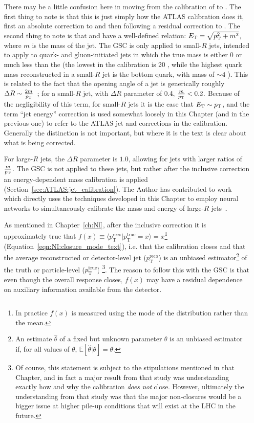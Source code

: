 There may be a little confusion here in moving from the calibration of \Et{} to \pt{}.
The first thing to note is that this is just simply how the ATLAS calibration does it, first an absolute correction to \Et{} and then following a residual correction to \pt{}.
The second thing to note is that \Et{} and \pt{} have a well-defined relation: $E_{\text{T}}=\sqrt{p_{\text{T}}^2+m^2}$, where $m$ is the mass of the jet.
The GSC is only applied to small-$R$ jets, intended to apply to quark- and gluon-initiated jets in which the true mass is either $0$ or much less than the \pt{} (the lowest \pt{} in the calibration is 20 \GeV, while the highest quark mass reconstructed in a small-$R$ jet is the bottom quark, with mass of $\sim4$ \GeV).
This is related to the fact that the opening angle of a jet is generically roughly $\Delta R \sim \frac{2m}{p_{\text{T}}}$~\cite{Shelton:2013an}; for a small-$R$ jet, with $\Delta R$ parameter of 0.4, $\frac{m}{p_{\text{T}}}<0.2$.
Because of the negligibility of this term, for small-$R$ jets it is the case that $E_{\text{T}}\sim p_{\text{T}}$, and the term ``jet energy'' correction is used somewhat loosely in this Chapter (and in the previous one) to refer to the ATLAS jet \Et{} and \pT{} corrections in the calibration.
Generally the distinction is not important, but where it is the text is clear about what is being corrected.

For large-$R$ jets, the $\Delta R$ parameter is $1.0$, allowing for jets with larger ratios of $\frac{m}{p_{\text{T}}}$.
The GSC is not applied to these jets, but rather after the inclusive \Et{} correction an energy-dependent mass calibration is applied (Section~\ref{sec:ATLAS:jet_calibration}).
The Author has contributed to work which directly uses the techniques developed in this Chapter to employ neural networks to simultaneously calibrate the mass and energy of large-$R$ jets~\cite{ATL-PHYS-PUB-2020-001}.

As mentioned in Chapter~\ref{ch:NI}, after the inclusive correction it is approximately true that $f(x)\equiv \langle p_\text{T}^\text{reco}|p_\text{T}^\text{true}=x\rangle = x$\footnote{In practice $f(x)$ is measured using the mode of the distribution rather than the mean.} (Equation~\ref{eqn:NI:closure_mode_text}), i.e. that the calibration closes and that the average reconstructed or detector-level jet \pt{} ($p_\text{T}^\text{reco}$) is an unbiased estimator\footnote{An estimate $\hat{\theta}$ of a fixed but unknown parameter $\theta$ is an unbiased estimator if, for all values of $\theta$, $\mathbb{E}\left[\hat{\theta}|\theta\right] = \theta$.} of the truth or particle-level \pt{} ($p_\text{T}^\text{true}$)
\footnote{Of course, this statement is subject to the stipulations mentioned in that Chapter, and in fact a major result from that study was understanding exactly how and why the calibration \textit{does not} close. However, ultimately the understanding from that study was that the major non-closures would be a bigger issue at higher pile-up conditions that will exist at the LHC in the future.}.
The reason to follow this with the GSC is that even though the overall response closes, $f(x)$ may have a residual dependence on auxiliary information available from the detector.

